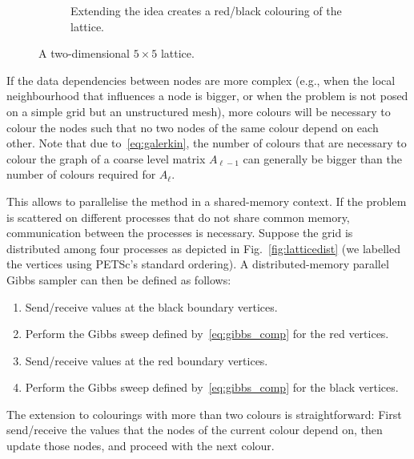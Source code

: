 \documentclass[
fontsize=11pt,
paper=a4,
numbers=noenddot
]{scrartcl}
\begin{document}
\begin{figure}[htpb]
\begin{subfigure}[t]{.48\linewidth}
        \caption{Extending the idea creates a red/black colouring of the lattice.}\label{fig:lattice2}
    \end{subfigure}
    \caption{A two-dimensional $5 \times 5$ lattice.}\label{fig:lattice}
  \end{figure}
  

If the data dependencies between nodes are more complex (e.g., when the local neighbourhood that influences a node is bigger, or when the problem is not posed on a simple grid but an unstructured mesh), more colours will be necessary to colour the nodes such that no two nodes of the same colour depend on each other. Note that due to~\eqref{eq:galerkin}, the number of colours that are necessary to colour the graph of a coarse level matrix $A_{\ell-1}$ can generally be bigger than the number of colours required for $A_{\ell}$.

This allows to parallelise the method in a shared-memory context. If the problem is scattered on different processes that do not share common memory, communication between the processes is necessary. Suppose the grid is distributed among four processes as depicted in Fig.~\ref{fig:latticedist} (we labelled the vertices using PETSc's standard ordering). A distributed-memory parallel Gibbs sampler can then be defined as follows:
\begin{enumerate}
    \item Send/receive values at the black boundary vertices.
    \item Perform the Gibbs sweep defined by~\eqref{eq:gibbs_comp} for the red vertices.
    \item Send/receive values at the red boundary vertices.
    \item Perform the Gibbs sweep defined by~\eqref{eq:gibbs_comp} for the black vertices.
\end{enumerate}
The extension to colourings with more than two colours is straightforward: First send/receive the values that the nodes of the current colour depend on, then update those nodes, and proceed with the next colour.
\end{document}
